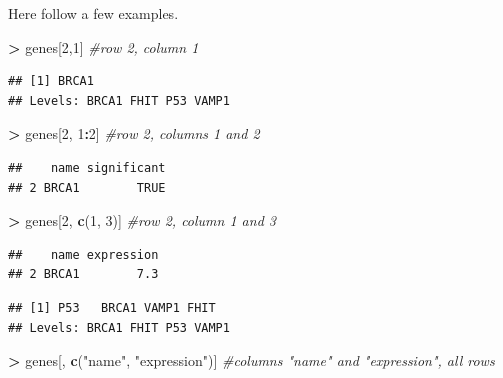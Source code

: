 \documentclass[]{book}
\newenvironment{Shaded}{\begin{snugshade}}{\end{snugshade}}
\newcommand{\CommentTok}[1]{\textcolor[rgb]{0.56,0.35,0.01}{\textit{#1}}}
\newcommand{\DecValTok}[1]{\textcolor[rgb]{0.00,0.00,0.81}{#1}}
\newcommand{\KeywordTok}[1]{\textcolor[rgb]{0.13,0.29,0.53}{\textbf{#1}}}
\newcommand{\NormalTok}[1]{#1}
\newcommand{\OperatorTok}[1]{\textcolor[rgb]{0.81,0.36,0.00}{\textbf{#1}}}
\newcommand{\StringTok}[1]{\textcolor[rgb]{0.31,0.60,0.02}{#1}}
\begin{document}
Here follow a few examples.

\begin{Shaded}
\begin{Highlighting}[]
\OperatorTok{>}\StringTok{ }\NormalTok{genes[}\DecValTok{2}\NormalTok{,}\DecValTok{1}\NormalTok{]            }\CommentTok{#row 2, column 1}
\end{Highlighting}
\end{Shaded}

\begin{verbatim}
## [1] BRCA1
## Levels: BRCA1 FHIT P53 VAMP1
\end{verbatim}

\begin{Shaded}
\begin{Highlighting}[]
\OperatorTok{>}\StringTok{ }\NormalTok{genes[}\DecValTok{2}\NormalTok{, }\DecValTok{1}\OperatorTok{:}\DecValTok{2}\NormalTok{]     }\CommentTok{#row 2, columns 1 and 2}
\end{Highlighting}
\end{Shaded}

\begin{verbatim}
##    name significant
## 2 BRCA1        TRUE
\end{verbatim}

\begin{Shaded}
\begin{Highlighting}[]
\OperatorTok{>}\StringTok{ }\NormalTok{genes[}\DecValTok{2}\NormalTok{, }\KeywordTok{c}\NormalTok{(}\DecValTok{1}\NormalTok{, }\DecValTok{3}\NormalTok{)] }\CommentTok{#row 2, column 1 and 3}
\end{Highlighting}
\end{Shaded}

\begin{verbatim}
##    name expression
## 2 BRCA1        7.3
\end{verbatim}

\begin{Shaded}
\end{Shaded}

\begin{verbatim}
## [1] P53   BRCA1 VAMP1 FHIT 
## Levels: BRCA1 FHIT P53 VAMP1
\end{verbatim}

\begin{Shaded}
\begin{Highlighting}[]
\OperatorTok{>}\StringTok{ }\NormalTok{genes[, }\KeywordTok{c}\NormalTok{(}\StringTok{"name"}\NormalTok{, }\StringTok{"expression"}\NormalTok{)]  }\CommentTok{#columns "name" and "expression", all rows}
\end{Highlighting}
\end{Shaded}
\end{document}
